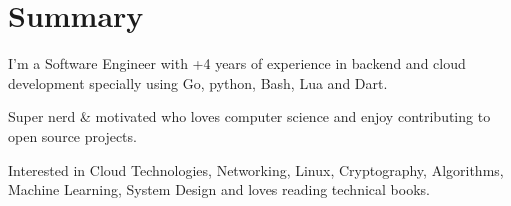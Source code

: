 \section{Summary}\closesection{}

I'm a Software Engineer with +4 years of experience in backend and cloud development specially using Go, python, Bash, Lua and Dart.

Super nerd \& motivated who loves computer science and enjoy contributing to open source projects.

Interested in Cloud Technologies, Networking, Linux, Cryptography, Algorithms, Machine Learning, System Design and loves reading technical books.
